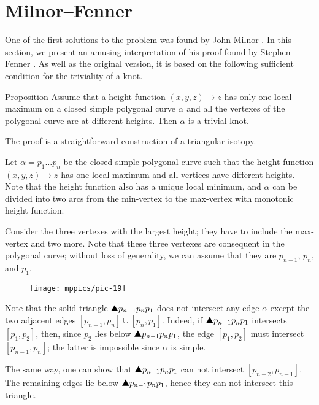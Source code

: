 \section{Milnor--Fenner}

One of the first solutions to the problem was found by John Milnor \cite{milnor}.
In this section, we present an amusing interpretation of his proof found by Stephen Fenner \cite{ferner}.
As well as the original version, it is based on the following sufficient condition for the triviality of a knot.

\begin{thm}{Proposition}\label{prop:one-max-one-min}
Assume that a height function $(x,y,z)\to z$ 
has only one local maximum on a closed simple polygonal curve $\alpha$ and all the vertexes of the polygonal curve are at different heights.
Then $\alpha$ is a trivial knot.
\end{thm}

The proof is a straightforward construction of a triangular isotopy. 

Let $\alpha=p_1\dots p_n$ be the closed simple polygonal curve
such that the height function $(x,y,z)\to z$ has one local maximum and all vertices have different heights.
Note that the height function also has a unique local minimum,
and $\alpha$ can be divided into two arcs from the min-vertex to the max-vertex with monotonic height function.

Consider the three vertexes with the largest height;
they have to include the max-vertex and two more.
Note that these three vertexes are consequent in the polygonal curve; 
without loss of generality, we can assume that they are $p_{n-1}$, $p_n$, and $p_1$.

\begin{wrapfigure}{r}{30 mm}
\vskip-0mm
\centering
\texttt{[image: mppics/pic-19]}
\vskip0mm
\end{wrapfigure}

Note that the solid triangle $\solidtriangle p_{n-1}p_np_1$ does not intersect any edge $\alpha$ except the two adjacent edges $[p_{n-1},p_n]\cup[p_n,p_1]$.
Indeed, if $\solidtriangle p_{n-1}p_np_1$ intersects $[p_1,p_2]$,
then, 
since $p_2$ lies below $\solidtriangle p_{n-1}p_np_1$,
the edge $[p_1,p_2]$ must intersect $[p_{n-1},p_n]$;
the latter is impossible since $\alpha$ is simple.

The same way, one can show that $\solidtriangle p_{n-1}p_np_1$ can not intersect $[p_{n-2},p_{n-1}]$.
The remaining edges lie below $\solidtriangle p_{n-1}p_np_1$, hence they can not intersect this triangle.

